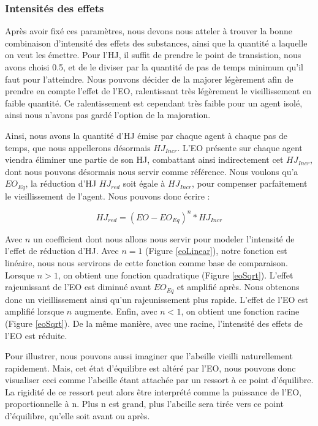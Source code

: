 \documentclass[11pt,a4paper]{report}
\begin{document}
	
	\subsubsection{Intensités des effets}	
	Après avoir fixé ces paramètres, nous devons nous atteler à trouver la bonne combinaison d'intensité des effets des substances, ainsi que la quantité a laquelle on veut les émettre. Pour l'HJ, il suffit de prendre le point de transistion, nous avons choisi 0.5, et de le diviser par la quantité de pas de temps minimum qu'il faut pour l'atteindre. Nous pouvons décider de la majorer légèrement afin de prendre en compte l'effet de l'EO, ralentissant très légèrement le vieillissement en faible quantité. Ce ralentissement est cependant très faible pour un agent isolé, ainsi nous n'avons pas gardé l'option de la majoration.
	
	Ainsi, nous avons la quantité d'HJ émise par chaque agent à chaque pas de temps, que nous appellerons désormais $HJ_{Incr}$. L'EO présente sur chaque agent viendra éliminer une partie de son HJ, combattant ainsi indirectement cet $HJ_{Incr}$, dont nous pouvons désormais nous servir comme référence. Nous voulons qu'a $EO_{Eq}$, la réduction d'HJ $HJ_{red}$ soit égale à $HJ_{Incr}$, pour compenser parfaitement le vieillissement de l'agent. Nous pouvons donc écrire :
	
	\begin{equation}
		 HJ_{red} = (EO - EO_{Eq})^n * HJ_{Incr}
	\label{hjRED}
	\end{equation}
	
	Avec $n$ un coefficient dont nous allons nous servir pour modeler l'intensité de l'effet de réduction d'HJ. Avec $n=1$ (Figure \ref{eoLinear}), notre fonction est linéaire, nous nous servirons de cette fonction comme base de comparaison. Lorsque $n>1$, on obtient une fonction quadratique (Figure \ref{eoSqrt}). L'effet rajeunissant de l'EO est diminué avant $EO_{Eq}$ et amplifié après. Nous obtenons donc un vieillissement ainsi qu'un rajeunissement plus rapide. L'effet de l'EO est amplifié lorsque $n$ augmente. Enfin, avec $n < 1$, on obtient une fonction racine (Figure \ref{eoSqrt}). De la même manière, avec une racine, l'intensité des effets de l'EO est réduite.
	
	Pour illustrer, nous pouvons aussi imaginer que l'abeille vieilli naturellement rapidement. Mais, cet état d'équilibre est altéré par l'EO, nous pouvons donc visualiser ceci comme l'abeille étant attachée par un ressort à ce point d'équilibre. La rigidité de ce ressort peut alors être interprété comme la puissance de l'EO, proportionnelle à n. Plus n est grand, plus l'abeille sera tirée vers ce point d'équilibre, qu'elle soit avant ou après.
	
\end{document}
